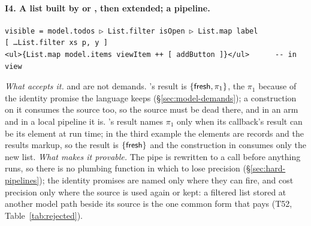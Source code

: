 \paragraph{I4. A list built by  or , then extended; a pipeline.}
\begin{Verbatim}
visible = model.todos ▷ List.filter isOpen ▷ List.map label
[ …List.filter xs p, y ]
<ul>{List.map model.items viewItem ++ [ addButton ]}</ul>      -- in view
\end{Verbatim}
\emph{What accepts it.}  and  are not demands. 's result is
$\{\mathsf{fresh}, \pi_1\}$, the $\pi_1$ because of the identity promise the language keeps
(\S\ref{sec:model-demands}); a construction on it consumes the source too, so the source must be dead
there, and in an  arm and in a local pipeline it is. 's result names $\pi_1$ only
when its callback's result can be its element at run time; in the third example the elements are records
and the results markup, so the result is $\{\mathsf{fresh}\}$ and the construction in  consumes only
the new list. \emph{What makes it provable.} The pipe is rewritten to a call before anything runs, so
there is no plumbing function in which to lose precision (\S\ref{sec:hard-pipelines}); the identity
promises are named only where they can fire, and cost precision only where the source is used again or
kept: a filtered list stored at another model path beside its source is the one common form that pays
(T52, Table~\ref{tab:rejected}).

